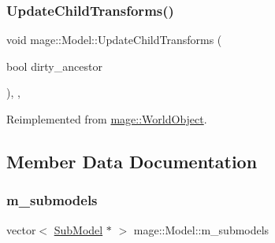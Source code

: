 \subsubsection{\texorpdfstring{Update\+Child\+Transforms()}{UpdateChildTransforms()}}
{\footnotesize\ttfamily void mage\+::\+Model\+::\+Update\+Child\+Transforms (\begin{DoxyParamCaption}\item[{bool}]{dirty\+\_\+ancestor }\end{DoxyParamCaption})\hspace{0.3cm}{\ttfamily [override]}, {\ttfamily [private]}, {\ttfamily [virtual]}}



Reimplemented from \hyperlink{classmage_1_1_world_object_ab384751f7c14c931e8606f927825b6c8}{mage\+::\+World\+Object}.



\subsection{Member Data Documentation}
\hypertarget{classmage_1_1_model_ab62e74450091e144b7b62d6570ec7af7}{}\label{classmage_1_1_model_ab62e74450091e144b7b62d6570ec7af7} 
\subsubsection{\texorpdfstring{m\+\_\+submodels}{m\_submodels}}
{\footnotesize\ttfamily vector$<$ \hyperlink{classmage_1_1_sub_model}{Sub\+Model} $\ast$ $>$ mage\+::\+Model\+::m\+\_\+submodels\hspace{0.3cm}{\ttfamily [private]}}

